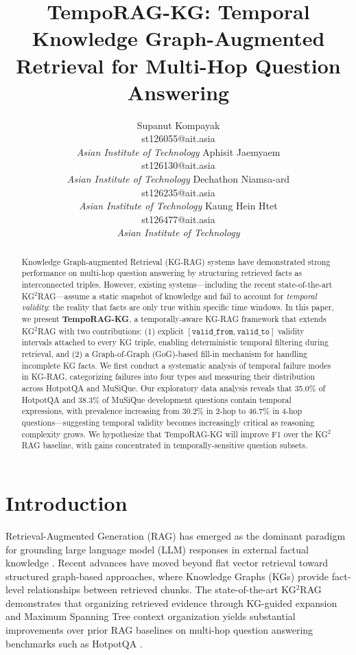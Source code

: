\documentclass[11pt]{article}
\title{TempoRAG-KG: Temporal Knowledge Graph-Augmented\\
Retrieval for Multi-Hop Question Answering}
\author{
  Supanut Kompayak \\
  st126055@ait.asia \\
  \textit{Asian Institute of Technology}
  \And
  Aphisit Jaemyaem \\
  st126130@ait.asia \\
  \textit{Asian Institute of Technology}
  \AND
  Dechathon Niamsa-ard \\
  st126235@ait.asia \\
  \textit{Asian Institute of Technology}
  \And
  Kaung Hein Htet \\
  st126477@ait.asia \\
  \textit{Asian Institute of Technology}
}
\begin{document}
\maketitle

\begin{abstract}
Knowledge Graph-augmented Retrieval (KG-RAG) systems have demonstrated
strong performance on multi-hop question answering by structuring retrieved
facts as interconnected triples. However, existing systems---including the
recent state-of-the-art KG$^2$RAG---assume a static snapshot of knowledge
and fail to account for \textit{temporal validity}: the reality that facts
are only true within specific time windows. In this paper, we present
\textbf{TempoRAG-KG}, a temporally-aware KG-RAG framework that extends
KG$^2$RAG with two contributions: (1) explicit $[\mathtt{valid\_from},
\mathtt{valid\_to}]$ validity intervals attached to every KG triple,
enabling deterministic temporal filtering during retrieval, and (2) a
Graph-of-Graph (GoG)-based fill-in mechanism for handling incomplete KG
facts. We first conduct a systematic analysis of temporal failure modes in
KG-RAG, categorizing failures into four types and measuring their
distribution across HotpotQA and MuSiQue. Our exploratory data analysis
reveals that 35.0\% of HotpotQA and 38.3\% of MuSiQue development
questions contain temporal expressions, with prevalence increasing from
30.2\% in 2-hop to 46.7\% in 4-hop questions---suggesting temporal validity
becomes increasingly critical as reasoning complexity grows. We hypothesize
that TempoRAG-KG will improve F1 over the KG$^2$RAG baseline, with gains
concentrated in temporally-sensitive question subsets.
\end{abstract}

\section{Introduction}

Retrieval-Augmented Generation (RAG) has emerged as the dominant paradigm
for grounding large language model (LLM) responses in external factual
knowledge \cite{lewis2020retrieval}. Recent advances have moved beyond
flat vector retrieval toward structured graph-based approaches, where
Knowledge Graphs (KGs) provide fact-level relationships between retrieved
chunks. The state-of-the-art KG$^2$RAG \cite{zhu2025kg2rag} demonstrates
that organizing retrieved evidence through KG-guided expansion and Maximum
Spanning Tree context organization yields substantial improvements over
prior RAG baselines on multi-hop question answering benchmarks such as
HotpotQA \cite{yang2018hotpotqa}.
\end{document}
